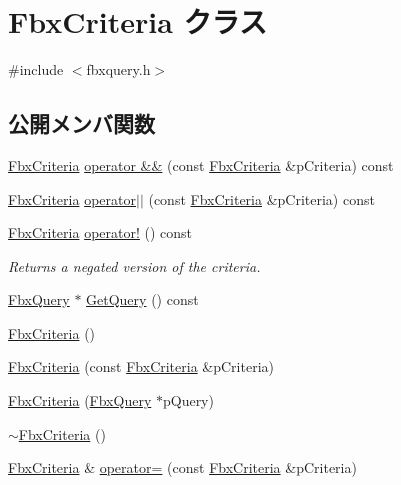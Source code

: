 \hypertarget{class_fbx_criteria}{}\section{Fbx\+Criteria クラス}
\label{class_fbx_criteria}


{\ttfamily \#include $<$fbxquery.\+h$>$}

\subsection*{公開メンバ関数}
\begin{DoxyCompactItemize}
\item 
\hyperlink{class_fbx_criteria}{Fbx\+Criteria} \hyperlink{class_fbx_criteria_a413bfdd843fa25e6ff94f942b25114f9}{operator \&\&} (const \hyperlink{class_fbx_criteria}{Fbx\+Criteria} \&p\+Criteria) const
\item 
\hyperlink{class_fbx_criteria}{Fbx\+Criteria} \hyperlink{class_fbx_criteria_a550446bf7c351b7cd09098bbe74d5d64}{operator$\vert$$\vert$} (const \hyperlink{class_fbx_criteria}{Fbx\+Criteria} \&p\+Criteria) const
\item 
\hyperlink{class_fbx_criteria}{Fbx\+Criteria} \hyperlink{class_fbx_criteria_ad2da0815273fdbcca514b80d77cb58bd}{operator!} () const
\begin{DoxyCompactList}\small\item\em Returns a negated version of the criteria. \end{DoxyCompactList}\item 
\hyperlink{class_fbx_query}{Fbx\+Query} $\ast$ \hyperlink{class_fbx_criteria_ac91d0ae92b399ad78114d851d08cd850}{Get\+Query} () const
\item 
\hyperlink{class_fbx_criteria_a6fad9ae6073408c66b145a5fe0bb000f}{Fbx\+Criteria} ()
\item 
\hyperlink{class_fbx_criteria_afa1c0c24262d51ccda5bb559afa4ac33}{Fbx\+Criteria} (const \hyperlink{class_fbx_criteria}{Fbx\+Criteria} \&p\+Criteria)
\item 
\hyperlink{class_fbx_criteria_ad30265af41804a2e45d2705a837e226c}{Fbx\+Criteria} (\hyperlink{class_fbx_query}{Fbx\+Query} $\ast$p\+Query)
\item 
\hyperlink{class_fbx_criteria_a02a46eab5950a5b6a5059e2db3328713}{$\sim$\+Fbx\+Criteria} ()
\item 
\hyperlink{class_fbx_criteria}{Fbx\+Criteria} \& \hyperlink{class_fbx_criteria_a9ffc10bdc0222d4fde6e902890dca8b2}{operator=} (const \hyperlink{class_fbx_criteria}{Fbx\+Criteria} \&p\+Criteria)
\end{DoxyCompactItemize}
